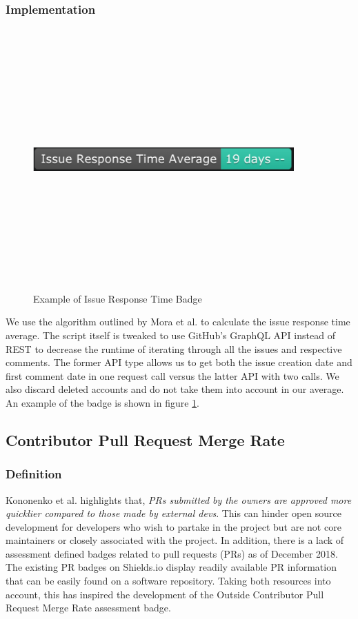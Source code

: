 \documentclass[12pt, letterpaper]{article}
\begin{document}
\subsubsection{Implementation}

\begin{figure}[!htb]
    \centerline{
        \includegraphics[width=10cm,height=10cm,keepaspectratio=true]{issueresponsebadge}
    }
    \caption{
        Example of Issue Response Time Badge
    }
    \label{issueresponse}
\end{figure}

We use the algorithm outlined by Mora et al. \cite{metrics} to calculate the issue response time average.
The script itself is tweaked to use GitHub's \cite{github} GraphQL API instead of REST to decrease the 
runtime of iterating through
all the issues and respective comments. 
The former API type allows us to get both the issue creation date and first
comment date in one request call versus the latter API with two calls.
We also discard deleted accounts and do not take them into account in our average.
An example of the badge is shown in figure \ref{issueresponse}.


\subsection{Contributor Pull Request Merge Rate}
\subsubsection{Definition}
Kononenko et al. \cite{shopifyarticle} highlights that, \textit{PRs submitted by the owners are approved more
quicklier compared to those made by external devs}. This can hinder open source development
for developers who wish to partake in the project but are not core maintainers or closely associated with the project.
In addition, there is a lack of assessment defined badges \cite{githubbadges} related to pull requests (PRs)
as of December 2018.
The existing PR badges on Shields.io \cite{shields} display readily available PR information that can be easily found on a 
software repository. Taking both resources \cite{shields, shopifyarticle} into account, this has inspired
the development of the Outside Contributor Pull Request Merge Rate assessment badge. 
\end{document}
